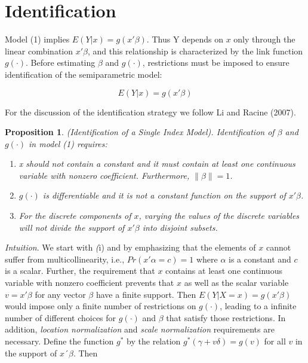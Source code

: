 \documentclass[a4paper]{article}
\newcommand{\norm}[1]{\left\lVert#1\right\rVert}
\begin{document}
\section{Identification} %
\label{sec:Identification}

Model (1) implies $E(Y|x) = g(x'\beta)$. Thus Y depends on $x$ only through the linear combination $x'\beta$, and this relationship is characterized by the link function $g(\cdot)$. Before estimating  $\beta$ and $ g(\cdot)$, restrictions must be imposed to ensure identification of the semiparametric model:

\[E(Y|x) = g(x'\beta) \]

\vspace{5mm} 

For the discussion of the identification strategy we follow Li and Racine (2007).


\newtheorem{prop}{Proposition}

\begin{prop}
(Identification of a Single Index Model). 
Identification of $\beta$ and $g(\cdot)$ in model (1) requires:
\begin{enumerate}[label=(\roman*)]
\item x should not contain a constant and it must contain at least one continuous variable with nonzero coefficient. Furthermore, $\norm{ \beta} = 1$. %
\item $g(\cdot)$ is differentiable and it is not a constant function on the support of $x'\beta$.
\item For the discrete components of $x$, varying the values of the discrete variables will not divide the support of $x'\beta$ into disjoint subsets.
\end{enumerate}
\end{prop}


\textit{Intuition}. We start with \textit(i) and by emphasizing that the elements of $x$ cannot suffer from multicollinearity, i.e., $Pr(x'\alpha = c)=1$ where $\alpha$ is a constant and $c$ is a scalar. Further, the requirement that $x$ contains at least one continuous variable with nonzero coefficient prevents that $x$ as well as the scalar variable $ v = x'\beta$ for any vector $\beta$ have a finite support. Then $E(Y|X = x) = g(x'\beta)$ would impose only a finite number of restrictions  on $g(\cdot)$, leading to a infinite number of different choices for $g(\cdot)$ and $\beta$ that satisfy those restrictions.  In addition, \textit{location normalization} and \textit{scale normalization} requirements are necessary. Define the function $g^*$ by the relation $g^*(\gamma + v\delta) = g(v)$ for all $v$ in the support of $x´\beta$. Then
\end{document}

